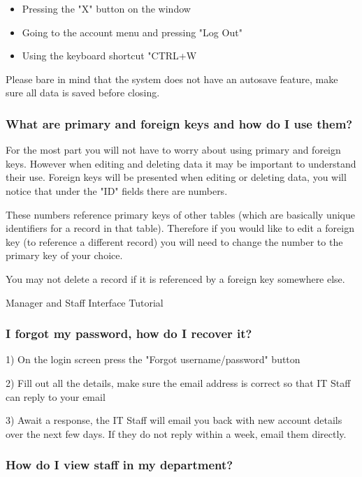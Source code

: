 \begin{itemize}
\item{Pressing the "X" button on the window}
\item{Going to the account menu and pressing "Log Out"}
\item{Using the keyboard shortcut "CTRL+W}
\end{itemize}

Please bare in mind that the system does not have an autosave feature, make sure all data is saved before closing.

\subsubsection{What are primary and foreign keys and how do I use them?}\label{keys}

For the most part you will not have to worry about using primary and foreign keys. However when editing and deleting data it may be important to understand their use. Foreign keys will be presented when editing or deleting data, you will notice that under the "ID" fields there are numbers.

These numbers reference primary keys of other tables (which are basically unique identifiers for a record in that table). Therefore if you would like to edit a foreign key (to reference a different record) you will need to change the number to the primary key of your choice.

You may not delete a record if it is referenced by a foreign key somewhere else.

Manager and Staff Interface Tutorial

\subsubsection{I forgot my password, how do I recover it?}

1) On the login screen press the "Forgot username/password" button

2) Fill out all the details, make sure the email address is correct so that IT Staff can reply to your email

3) Await a response, the IT Staff will email you back with new account details over the next few days. If they do not reply within a week, email them directly.

\subsubsection{How do I view staff in my department?}\label{department}

